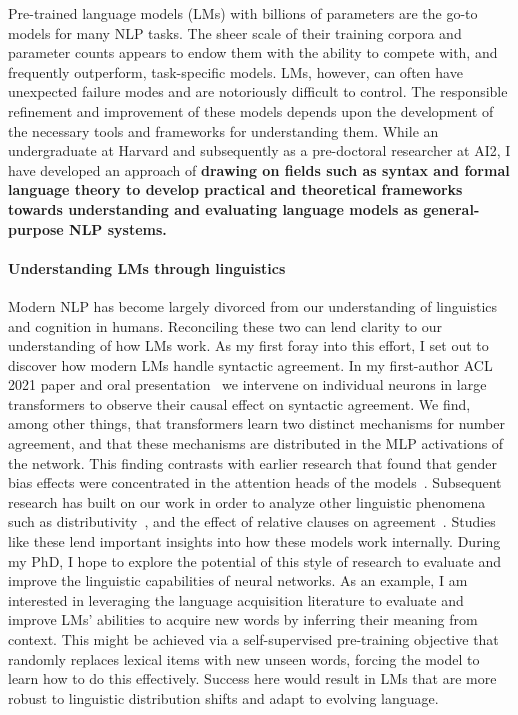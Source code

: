 \documentclass[11pt]{article}
\begin{document}
Pre-trained language models (LMs) with billions of parameters 
are the go-to models for many NLP tasks.
The sheer scale of their training corpora and parameter counts
appears to endow them with the ability to compete with, 
and frequently outperform, task-specific models.
LMs, however, can often have unexpected failure modes 
and are notoriously difficult to control.
The responsible refinement and improvement of these models
depends upon the development of the necessary tools 
and frameworks for understanding them.
While an undergraduate at Harvard and subsequently as a pre-doctoral researcher 
at AI2, I have developed an approach of \textbf{
  drawing on fields such as syntax and formal language theory 
  to develop practical and theoretical frameworks  
  towards understanding and evaluating language models 
  as general-purpose NLP systems.
}

\paragraph{Understanding LMs through linguistics}

Modern NLP has become largely divorced 
from our understanding of linguistics and cognition in humans.
Reconciling these two can lend clarity to our understanding of how LMs work.
As my first foray into this effort, I set out to 
discover how modern LMs handle syntactic agreement.
In my first-author ACL 2021 paper and oral presentation~\cite{Finlayson2021CausalAO}
we intervene on individual neurons in large transformers 
to observe their causal effect on syntactic agreement.
We find, among other things, that transformers learn 
two distinct mechanisms for number agreement,
and that these mechanisms are distributed in the MLP activations of the network.
This finding contrasts with earlier research that found that 
gender bias effects were concentrated in the attention heads of the models~\cite{Vig2020InvestigatingGB}.
Subsequent research has built on our work 
in order to analyze other linguistic phenomena 
such as distributivity~\cite{Ban2022TestingPL},
and the effect of relative clauses on agreement~\cite{Ravfogel2021CounterfactualIR}.
Studies like these lend important insights into how these models work internally.
During my PhD, I hope to explore the potential of this style of research 
to evaluate and improve the linguistic capabilities of neural networks. 
As an example, I am interested in leveraging the language acquisition literature
to evaluate and improve LMs' abilities 
to acquire new words by inferring their meaning from context.
This might be achieved via a self-supervised pre-training objective 
that randomly replaces lexical items with new unseen words, 
forcing the model to learn how to do this effectively.
Success here would result in LMs that are 
more robust to linguistic distribution shifts
and adapt to evolving language.
\end{document}
